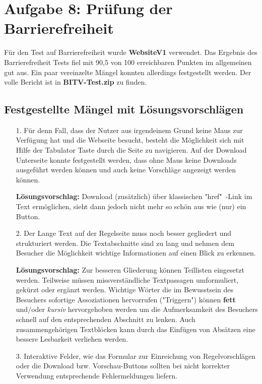 \documentclass{scrartcl}
\begin{document}
\section*{Aufgabe 8: Prüfung der Barrierefreiheit}
Für den Test auf Barrierefreiheit wurde \textbf{WebsiteV1} verwendet.
Das Ergebnis des Barrierefreiheit Tests fiel mit 90,5 von 100 erreichbaren Punkten im allgemeinen gut aus. Ein paar vereinzelte Mängel konnten allerdings festgestellt werden. Der volle Bericht ist in \textbf{BITV-Test.zip} zu finden.

\subsection*{Festgestellte Mängel mit Lösungsvorschlägen}
\begin{itemize}

\item[1.]Für denn Fall, dass der Nutzer aus irgendeinem Grund keine Maus zur Verfügung hat und die Webseite besucht, besteht die Möglichkeit sich mit Hilfe der Tabulator Taste durch die Seite zu navigieren. Auf der Download Unterseite konnte festgestellt werden, dass ohne Maus keine Downloads ausgeführt werden können und auch keine Vorschläge angezeigt werden können.

\textbf{Lösungsvorschlag:} Download (zusätzlich) über klassischen "href"\ -Link im Text ermöglichen, sieht dann jedoch nicht mehr so schön aus wie (nur) ein Button.

\item[2.]Der Lange Text auf der Regelseite muss noch besser gegliedert und strukturiert werden. Die Textabschnitte sind zu lang und nehmen dem Besucher die Möglichkeit wichtige Informationen auf einen Blick zu erkennen.

\textbf{Lösungsvorschlag:} Zur besseren Gliederung können Teillisten eingesetzt werden. Teilweise müssen missverständliche Textpassagen umformuliert, gekürzt oder ergänzt werden. Wichtige Wörter die im Bewusstsein des Besuchers sofortige Assoziationen hervorrufen ("Triggern") können \textbf{fett} und/oder \textit{kursiv} hervorgehoben werden um die Aufmerksamkeit des Besuchers schnell auf den entsprechenden Abschnitt zu lenken. Auch zusammengehörigen Textblöcken kann durch das Einfügen von Absätzen eine bessere Lesbarkeit verliehen werden.

\item[3.]Interaktive Felder, wie das Formular zur Einreichung von Regelvorschlägen oder die Download bzw. Vorschau-Buttons sollten bei nicht korrekter Verwendung entsprechende Fehlermeldungen liefern.


\end{itemize}
\end{document}
